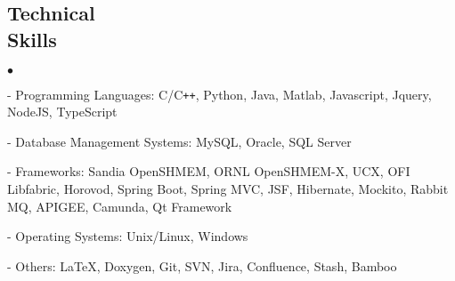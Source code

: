 \documentclass[margin,line]{res}
\newenvironment{list2}{
  \begin{list}{$\bullet$}{%
      \setlength{\itemsep}{0in}
      \setlength{\parsep}{0in} \setlength{\parskip}{0in}
      \setlength{\topsep}{0in} \setlength{\partopsep}{0in} 
      \setlength{\leftmargin}{0.2in}}}{\end{list}}
\begin{document}
\begin{resume}
\section{\sc Technical \\Skills}
\begin{list2}
\item[ - ] Programming Languages: C/C\texttt{++}, Python, Java, Matlab, 
Javascript, Jquery, NodeJS, TypeScript
\item[ - ] Database Management Systems: MySQL, Oracle, SQL Server
\item[ - ] Frameworks: Sandia OpenSHMEM, ORNL OpenSHMEM-X, UCX, OFI Libfabric, 
Horovod, Spring Boot, Spring MVC, JSF, Hibernate, 
Mockito, Rabbit MQ, APIGEE, Camunda, Qt Framework
\item[ - ] Operating Systems: Unix/Linux, Windows
\item[ - ] Others: \LaTeX, Doxygen, Git, SVN, Jira, Confluence, Stash, Bamboo
\end{list2}

\vspace*{-.15in}

\end{resume}
\end{document}
